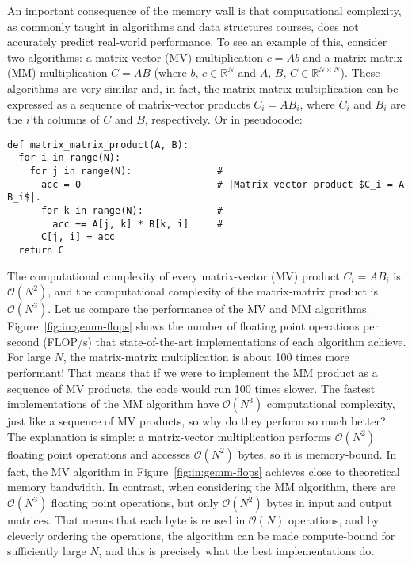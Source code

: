 An important consequence of the memory wall is that computational complexity, as commonly taught in algorithms and data structures courses, does not accurately predict real-world performance. To see an example of this, consider two algorithms: a matrix-vector (MV) multiplication $c = A b$ and a matrix-matrix (MM) multiplication $C = A B$ (where $b,\,c\in \mathbb{R}^N$ and $A,\,B,\,C\in \mathbb{R}^{N\times N}$). These algorithms are very similar and, in fact, the matrix-matrix multiplication can be expressed as a sequence of matrix-vector products $C_i = A B_i$, where $C_i$ and $B_i$ are the $i$'th columns of $C$ and $B$, respectively. Or in pseudocode:
\begin{verbatim}
def matrix_matrix_product(A, B):
  for i in range(N):
    for j in range(N):               #
      acc = 0                        # |Matrix-vector product $C_i = A B_i$|.
      for k in range(N):             # 
        acc += A[j, k] * B[k, i]     #
      C[j, i] = acc
  return C
\end{verbatim}
The computational complexity of every matrix-vector (MV) product $C_i = A B_i$ is $\mathcal{O}(N^2)$, and the computational complexity of the matrix-matrix product is $\mathcal{O}(N^3)$. Let us compare the performance of the MV and MM algorithms. Figure~\ref{fig:in:gemm-flops} shows the number of floating point operations per second (FLOP/s) that state-of-the-art implementations of each algorithm achieve. For large $N$, the matrix-matrix multiplication is about 100 times more performant! That means that if we were to implement the MM product as a sequence of MV products, the code would run 100 times slower. The fastest implementations of the MM algorithm have $\mathcal{O}(N^3)$ computational complexity, just like a sequence of MV products, so why do they perform so much better? The explanation is simple: a matrix-vector multiplication performs $\mathcal{O}(N^2)$ floating point operations and accesses $\mathcal{O}(N^2)$ bytes, so it is memory-bound. In fact, the MV algorithm in Figure~\ref{fig:in:gemm-flops} achieves close to theoretical memory bandwidth. In contrast, when considering the MM algorithm, there are $\mathcal{O}(N^3)$ floating point operations, but only $\mathcal{O}(N^2)$ bytes in input and output matrices. That means that each byte is reused in $\mathcal{O}(N)$ operations, and by cleverly ordering the operations, the algorithm can be made compute-bound for sufficiently large $N$, and this is precisely what the best implementations do.

